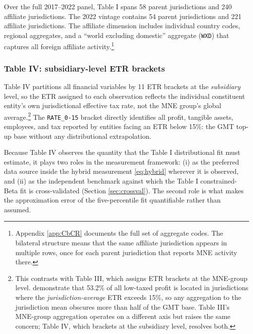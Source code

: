 \documentclass[11pt,a4paper]{article}
\newcommand{\code}[1]{\texttt{#1}}
\begin{document}
Over the full 2017--2022 panel, Table I spans 58 parent jurisdictions and 240 affiliate jurisdictions. The 2022 vintage contains 54 parent jurisdictions and 221 affiliate jurisdictions. The affiliate dimension includes individual country codes, regional aggregates, and a ``world excluding domestic'' aggregate (\code{WXD}) that captures all foreign affiliate activity.\footnote{Appendix \ref{app:CbCR} documents the full set of aggregate codes. The bilateral structure means that the same affiliate jurisdiction appears in multiple rows, once for each parent jurisdiction that reports MNE activity there.}

\subsubsection{Table IV: subsidiary-level ETR brackets}\label{sec:t4_main}

Table IV partitions all financial variables by 11 ETR brackets at the \emph{subsidiary} level, so the ETR assigned to each observation reflects the individual constituent entity's own jurisdictional effective tax rate, not the MNE group's global average.\footnote{This contrasts with Table III, which assigns ETR brackets at the MNE-group level. \citet{hugger2026} demonstrate that 53.2\% of all low-taxed profit is located in jurisdictions where the \emph{jurisdiction-average} ETR exceeds 15\%, so any aggregation to the jurisdiction mean obscures more than half of the GMT base. Table III's MNE-group aggregation operates on a different axis but raises the same concern; Table IV, which brackets at the subsidiary level, resolves both.} The \code{RATE\_0-15} bracket directly identifies all profit, tangible assets, employees, and tax reported by entities facing an ETR below 15\%: the GMT top-up base without any distributional extrapolation.

Because Table IV observes the quantity that the Table I distributional fit must estimate, it plays two roles in the measurement framework: (i) as the preferred data source inside the hybrid measurement \eqref{eq:hybrid} wherever it is observed, and (ii) as the independent benchmark against which the Table I constrained-Beta fit is cross-validated (Section \ref{sec:crossval}). The second role is what makes the approximation error of the five-percentile fit quantifiable rather than assumed.
\end{document}
